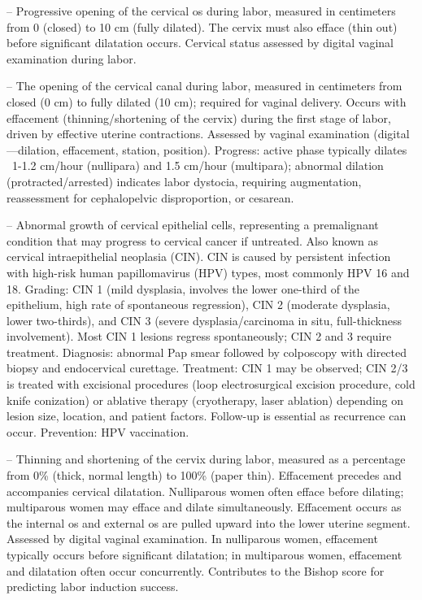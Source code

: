 -- Progressive opening of the cervical os during labor, measured in centimeters from 0 (closed) to 10 cm (fully dilated). The cervix must also efface (thin out) before significant dilatation occurs. Cervical status assessed by digital vaginal examination during labor.

-- The opening of the cervical canal during labor, measured in centimeters from closed (0 cm) to fully dilated (10 cm); required for vaginal delivery. Occurs with effacement (thinning/shortening of the cervix) during the first stage of labor, driven by effective uterine contractions. Assessed by vaginal examination (digital—dilation, effacement, station, position). Progress: active phase typically dilates ~1-1.2 cm/hour (nullipara) and 1.5 cm/hour (multipara); abnormal dilation (protracted/arrested) indicates labor dystocia, requiring augmentation, reassessment for cephalopelvic disproportion, or cesarean.

-- Abnormal growth of cervical epithelial cells, representing a premalignant condition that may progress to cervical cancer if untreated. Also known as cervical intraepithelial neoplasia (CIN). CIN is caused by persistent infection with high-risk human papillomavirus (HPV) types, most commonly HPV 16 and 18. Grading: CIN 1 (mild dysplasia, involves the lower one-third of the epithelium, high rate of spontaneous regression), CIN 2 (moderate dysplasia, lower two-thirds), and CIN 3 (severe dysplasia/carcinoma in situ, full-thickness involvement). Most CIN 1 lesions regress spontaneously; CIN 2 and 3 require treatment. Diagnosis: abnormal Pap smear followed by colposcopy with directed biopsy and endocervical curettage. Treatment: CIN 1 may be observed; CIN 2/3 is treated with excisional procedures (loop electrosurgical excision procedure, cold knife conization) or ablative therapy (cryotherapy, laser ablation) depending on lesion size, location, and patient factors. Follow-up is essential as recurrence can occur. Prevention: HPV vaccination.

-- Thinning and shortening of the cervix during labor, measured as a percentage from 0\% (thick, normal length) to 100\% (paper thin). Effacement precedes and accompanies cervical dilatation. Nulliparous women often efface before dilating; multiparous women may efface and dilate simultaneously. Effacement occurs as the internal os and external os are pulled upward into the lower uterine segment. Assessed by digital vaginal examination. In nulliparous women, effacement typically occurs before significant dilatation; in multiparous women, effacement and dilatation often occur concurrently. Contributes to the Bishop score for predicting labor induction success.


